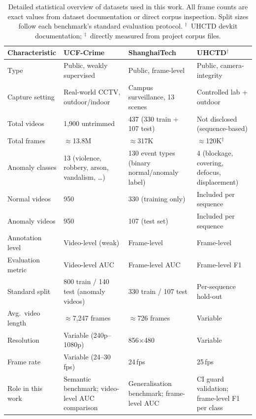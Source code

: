 \documentclass[sensors,article,submit,pdftex,moreauthors]{Definitions/mdpi}
\begin{document}
\begin{table}[H]
\caption{Detailed statistical overview of datasets used in this work.
All frame counts are exact values from dataset documentation or
direct corpus inspection. Split sizes follow each benchmark's
standard evaluation protocol. $^\dagger$~UHCTD devkit documentation;
$^\ddagger$~directly measured from project corpus files.}
\label{tab:method-datasets}
\centering
\small
\setlength{\tabcolsep}{4pt}
\renewcommand{\arraystretch}{1.15}
\begin{tabular}{p{2.6cm} p{3.8cm} p{3.8cm} p{3.2cm}}
\toprule
\textbf{Characteristic} &
\textbf{UCF-Crime}~\cite{sultani2018realworld} &
\textbf{ShanghaiTech}~\cite{georgescu2021anomaly} &
\textbf{UHCTD}$^\dagger$ \\
\midrule
Type              & Public, weakly supervised    & Public, frame-level          & Public, camera-integrity \\
Capture setting   & Real-world CCTV, outdoor/indoor & Campus surveillance, 13 scenes & Controlled lab + outdoor \\
Total videos      & 1,900 untrimmed              & 437 (330 train + 107 test)   & Not disclosed (sequence-based) \\
Total frames      & $\approx$13.8M               & $\approx$317K                & $\approx$120K$^\dagger$ \\
Anomaly classes   & 13 (violence, robbery, arson, vandalism, \ldots) & 130 event types (binary normal/anomaly label) & 4 (blockage, covering, defocus, displacement) \\
Normal videos     & 950                          & 330 (training only)          & Included per sequence \\
Anomaly videos    & 950                          & 107 (test set)               & Included per sequence \\
Annotation level  & Video-level (weak)           & Frame-level                  & Frame-level \\
Evaluation metric & Video-level AUC              & Frame-level AUC              & Frame-level F1 \\
Standard split    & 800 train / 140 test (anomaly videos) & 330 train / 107 test & Per-sequence hold-out \\
Avg.\ video length & $\approx$7,247 frames       & $\approx$726 frames          & Variable \\
Resolution        & Variable (240p--1080p)       & 856$\times$480               & Variable \\
Frame rate        & Variable (24--30\,fps)       & 24\,fps                      & 25\,fps \\
Role in this work & Semantic benchmark; video-level AUC comparison & Generalisation benchmark; frame-level AUC & CI guard validation; frame-level F1 per class \\
\bottomrule
\end{tabular}
 

\end{table}
\end{document}
